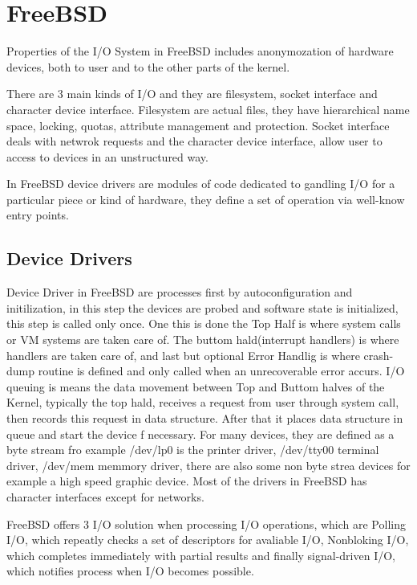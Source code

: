 \documentclass[letterpaper,10pt,draftclsnofoot,onecolumn]{IEEEtran}
\begin{document}



\section*{FreeBSD}

Properties of the I/O System in FreeBSD includes anonymozation of hardware devices, both to user and to the other parts of the kernel. 

There are 3 main kinds of I/O and they are filesystem, socket interface and character device interface. Filesystem are actual files, they have hierarchical name space, locking, quotas, attribute management and protection. Socket interface deals with netwrok requests and the character device interface, allow user to access to devices in an unstructured way.

In FreeBSD device drivers are modules of code dedicated to gandling I/O for a particular piece or kind of hardware, they define a set of operation via well-know entry points.

\subsection{Device Drivers}

Device Driver in FreeBSD are processes first by autoconfiguration and initilization, in this step the devices are probed and software state is initialized, this step is called only once. One this is done the Top Half is where system calls or VM systems are taken care of. The buttom hald(interrupt handlers) is where handlers are taken care of, and last but optional Error Handlig is where crash-dump routine is defined and only called when an unrecoverable error accurs. I/O queuing is means the data movement between Top and Buttom halves of the Kernel, typically the top hald, receives a request from user through system call, then records this request in data structure. After that it places data structure in queue and start the device f necessary. For many devices, they are defined as a byte stream fro example /dev/lp0 is the printer driver, /dev/tty00 terminal driver, /dev/mem memmory driver, there are also some non byte strea devices for example a high speed graphic device. Most of the drivers in FreeBSD has character interfaces except for networks.


FreeBSD offers 3 I/O solution when processing I/O operations, which are Polling I/O, which repeatly checks a set of descriptors for avaliable I/O, Nonbloking I/O, which completes immediately with partial results and finally signal-driven I/O, which notifies process when I/O becomes possible.\cite{[2]}
\end{document}

